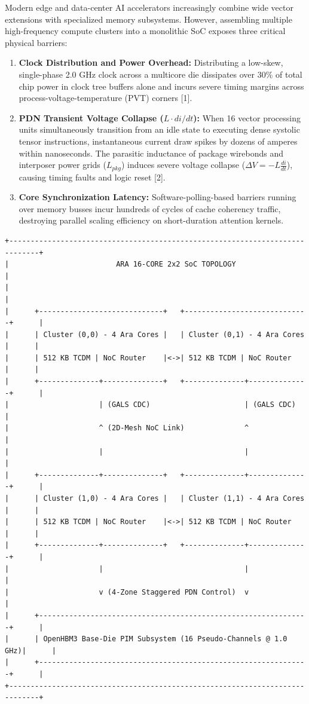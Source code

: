 \documentclass[journal,10pt,twocolumn]{IEEEtran}
\begin{document}
Modern edge and data-center AI accelerators increasingly combine wide vector extensions with specialized memory subsystems. However, assembling multiple high-frequency compute clusters into a monolithic SoC exposes three critical physical barriers:
\begin{enumerate}
  \item \textbf{Clock Distribution and Power Overhead:} Distributing a low-skew, single-phase 2.0 GHz clock across a multicore die dissipates over $30\%$ of total chip power in clock tree buffers alone and incurs severe timing margins across process-voltage-temperature (PVT) corners [1].
  \item \textbf{PDN Transient Voltage Collapse ($L \cdot di/dt$):} When 16 vector processing units simultaneously transition from an idle state to executing dense systolic tensor instructions, instantaneous current draw spikes by dozens of amperes within nanoseconds. The parasitic inductance of package wirebonds and interposer power grids ($L_{pkg}$) induces severe voltage collapse ($\Delta V = -L \frac{di}{dt}$), causing timing faults and logic reset [2].
  \item \textbf{Core Synchronization Latency:} Software-polling-based barriers running over memory busses incur hundreds of cycles of cache coherency traffic, destroying parallel scaling efficiency on short-duration attention kernels.
\end{enumerate}

\begin{footnotesize}\begin{verbatim}
+-----------------------------------------------------------------------------+
|                         ARA 16-CORE 2x2 SoC TOPOLOGY                        |
|                                                                             |
|      +-----------------------------+   +-----------------------------+      |
|      | Cluster (0,0) - 4 Ara Cores |   | Cluster (0,1) - 4 Ara Cores |      |
|      | 512 KB TCDM | NoC Router    |<->| 512 KB TCDM | NoC Router    |      |
|      +--------------+--------------+   +--------------+--------------+      |
|                     | (GALS CDC)                      | (GALS CDC)          |
|                     ^ (2D-Mesh NoC Link)              ^                     |
|                     |                                 |                     |
|      +--------------+--------------+   +--------------+--------------+      |
|      | Cluster (1,0) - 4 Ara Cores |   | Cluster (1,1) - 4 Ara Cores |      |
|      | 512 KB TCDM | NoC Router    |<->| 512 KB TCDM | NoC Router    |      |
|      +--------------+--------------+   +--------------+--------------+      |
|                     |                                 |                     |
|                     v (4-Zone Staggered PDN Control)  v                     |
|      +---------------------------------------------------------------+      |
|      | OpenHBM3 Base-Die PIM Subsystem (16 Pseudo-Channels @ 1.0 GHz)|      |
|      +---------------------------------------------------------------+      |
+-----------------------------------------------------------------------------+
\end{verbatim}\end{footnotesize}
\end{document}
